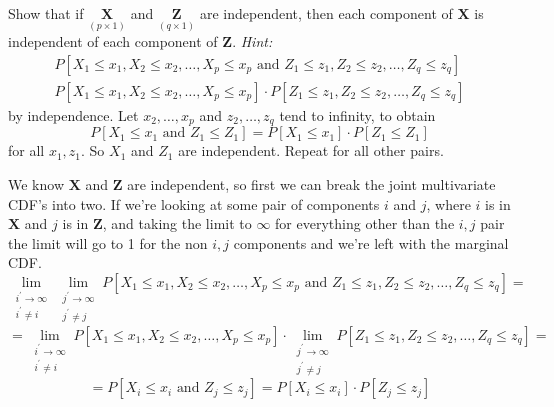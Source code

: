 Show that if $\underset{(p \times 1)}{\textbf{X}}$ and $\underset{(q \times 1)}{\textbf{Z}}$ are independent, then each component of $\textbf{X}$ is independent of each component of $\textbf{Z}$.
\newline
\textit{Hint:} \begin{multline*} P [ X_1 \leq x_1, X_2 \leq x_2, \dots, X_p \leq x_p\text{ and }Z_1 \leq z_1, Z_2 \leq z_2, \dots, Z_q \leq z_q ] 
    \\
    P [ X_1 \leq x_1, X_2 \leq x_2, \dots, X_p \leq x_p] \cdot P [ Z_1 \leq z_1, Z_2 \leq z_2, \dots, Z_q \leq z_q ]
\end{multline*}
by independence. Let $x_2, \dots, x_p$ and $z_2, \dots, z_q$ tend to infinity, to obtain
\[
    P [ X_1 \leq x_1\text{ and }Z_1 \leq Z_1] = P [ X_1 \leq x_1] \cdot P [Z_1 \leq Z_1]
\]
for all $x_1, z_1$. So $X_1$ and $Z_1$ are independent. Repeat for all other pairs.
\newline
\par
We know $\textbf{X}$ and $\textbf{Z}$ are independent, so first we can break the joint multivariate CDF's into two. If we're looking at some pair of components $i$ and $j$, where $i$ is in $\textbf{X}$ and $j$ is in $\textbf{Z}$, and taking the limit to $\infty$ for everything other than the $i,j$ pair the limit will go to 1 for the non $i,j$ components and we're left with the marginal CDF.
\[
    \lim_{\substack{i^{\prime} \to \infty\\i^{\prime} \ne i}}
    \lim_{\substack{j^{\prime} \to \infty\\j^{\prime} \ne j}}
    P [ X_1 \leq x_1, X_2 \leq x_2, \dots, X_p \leq x_p\text{ and }Z_1 \leq z_1, Z_2 \leq z_2, \dots, Z_q \leq z_q ]
    =
\]
\[
    =
    \lim_{\substack{i^{\prime} \to \infty\\i^{\prime} \ne i}} P [ X_1 \leq x_1, X_2 \leq x_2, \dots, X_p \leq x_p] \cdot \lim_{\substack{j^{\prime} \to \infty\\j^{\prime} \ne j}} P [ Z_1 \leq z_1, Z_2 \leq z_2, \dots, Z_q \leq z_q ]
    =
\]
\[
    =
    P [ X_i \leq x_i\text{ and }Z_j \leq z_j ]
    =
    P [ X_i \leq x_i] \cdot P [ Z_j \leq z_j ]
\]